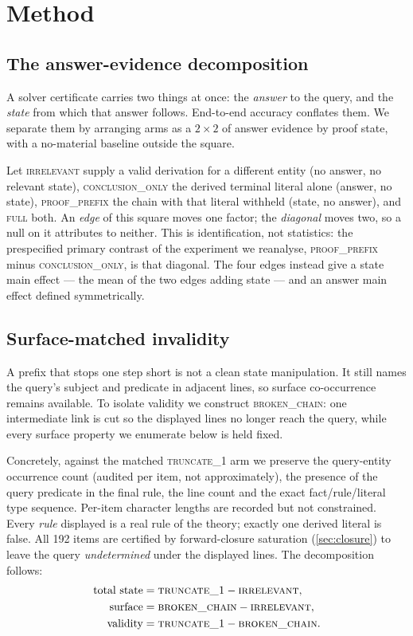 \documentclass[10pt,twocolumn]{article}
\begin{document}
\section{Method}

\subsection{The answer-evidence decomposition}
\label{sec:decomposition}

A solver certificate carries two things at once: the \emph{answer} to the query,
and the \emph{state} from which that answer follows. End-to-end accuracy
conflates them. We separate them by arranging arms as a $2\times2$ of answer
evidence by proof state, with a no-material baseline outside the square.

Let \textsc{irrelevant} supply a valid derivation for a different entity (no
answer, no relevant state), \textsc{conclusion\_only} the derived terminal
literal alone (answer, no state), \textsc{proof\_prefix} the chain with that
literal withheld (state, no answer), and \textsc{full} both. An \emph{edge} of this square moves one factor; the \emph{diagonal} moves two, so
a null on it attributes to neither. This is identification, not statistics: the
prespecified primary contrast of the experiment we reanalyse,
\textsc{proof\_prefix} minus \textsc{conclusion\_only}, is that diagonal. The four
edges instead give a state main effect --- the mean of the two edges adding
state --- and an answer main effect defined symmetrically.

\subsection{Surface-matched invalidity}
\label{sec:broken}

A prefix that stops one step short is not a clean state manipulation. It still
names the query's subject and predicate in adjacent lines, so surface
co-occurrence remains available. To isolate validity we construct
\textsc{broken\_chain}: one intermediate link is cut so the displayed lines no
longer reach the query, while every surface property we enumerate below is held
fixed.

Concretely, against the matched \textsc{truncate\_1} arm we preserve the
query-entity occurrence count (audited per item, not approximately), the
presence of the query predicate in the final rule, the line count and the exact fact/rule/literal type sequence. Per-item character
lengths are recorded but not constrained.
Every \emph{rule} displayed is a real rule of the theory; exactly one derived
literal is false. All 192 items are certified by forward-closure saturation
(\cref{sec:closure}) to leave the query \emph{undetermined} under the displayed
lines. The decomposition follows:
\begin{align}
\text{total state} &= \textsc{truncate\_1} - \textsc{irrelevant},\\
\text{surface} &= \textsc{broken\_chain} - \textsc{irrelevant},\\
\text{validity} &= \textsc{truncate\_1} - \textsc{broken\_chain}.
\end{align}
\end{document}

